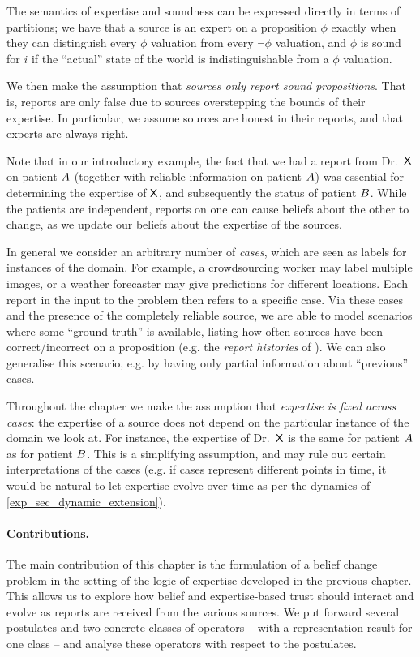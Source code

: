 The semantics of expertise and soundness can be expressed directly in terms of
partitions; we have that a source is an expert on a proposition $\phi$ exactly
when they can distinguish every $\phi$ valuation from every $\neg\phi$
valuation, and $\phi$ is sound for $i$ if the ``actual'' state of the world is
indistinguishable from a $\phi$ valuation.

We then make the assumption that \emph{sources only report sound propositions}.
That is, reports are only false due to sources overstepping the bounds of their
expertise. In particular, we assume sources are honest in their reports, and
that experts are always right.

Note that in our introductory example, the fact that we had a report from Dr.\ $\mathsf{X}$
on patient $A$ (together with reliable information on patient $A$) was essential
for determining the expertise of $\mathsf{X}$, and subsequently the status of patient
$B$. While the patients are independent, reports on one can cause beliefs about
the other to change, as we update our beliefs about the expertise of the
sources.

In general we consider an arbitrary number of \emph{cases}, which are
seen as labels for instances of the domain. For example, a crowdsourcing worker
may label multiple images, or a weather forecaster may give predictions for
different locations. Each report in the input to the
problem then refers to a specific case. Via these cases and the presence of the
completely reliable source, we are able to model scenarios where some ``ground
truth'' is available, listing how often sources have been correct/incorrect on a
proposition (e.g. the \emph{report histories} of
\textcite{hunter_building_21}). We can also generalise this scenario, e.g. by
having only partial information about ``previous'' cases.

Throughout the chapter we make the assumption that \emph{expertise is fixed
across cases}: the expertise of a source does not depend on the particular
instance of the domain we look at. For instance, the expertise of Dr.\ $\mathsf{X}$ is the
same for patient $A$ as for patient $B$. This is a simplifying assumption, and may
rule out certain interpretations of the cases (e.g. if cases represent
different points in time, it would be natural to let expertise evolve over
time as per the dynamics of \cref{exp_sec_dynamic_extension}).

\paragraph{Contributions.} The main contribution of this chapter is the
formulation of a belief change problem in the setting of the logic of expertise
developed in the previous chapter. This allows us to explore how belief and
expertise-based trust should interact and evolve as reports are received from
the various sources.  We put forward several postulates and two concrete
classes of operators -- with a representation result for one class -- and
analyse these operators with respect to the postulates.

